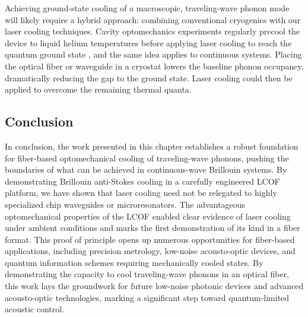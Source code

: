 Achieving ground-state cooling of a macroscopic, traveling-wave phonon mode will likely require a hybrid approach: combining conventional cryogenics with our laser cooling techniques. Cavity optomechanics experiments regularly precool the device to liquid helium temperatures before applying laser cooling to reach the quantum ground state \cite{doeleman2023brillouin}, and the same idea applies to continuous systems. Placing the optical fiber or waveguide in a cryostat lowers the baseline phonon occupancy, dramatically reducing the gap to the ground state. Laser cooling could then be applied to overcome the remaining thermal quanta.

\subsection{Conclusion}
\label{Cooling:subsec:Conclusion}

In conclusion, the work presented in this chapter establishes a robust foundation for fiber-based optomechanical cooling of traveling-wave phonons, pushing the boundaries of what can be achieved in continuous-wave Brillouin systems. By demonstrating Brillouin anti-Stokes cooling in a carefully engineered \ac{LCOF} platform, we have shown that laser cooling need not be relegated to highly specialized chip waveguides or microresonators. The advantageous optomechanical properties of the \ac{LCOF} enabled clear evidence of laser cooling under ambient conditions and marks the first demonstration of its kind in a fiber format. This proof of principle opens up numerous opportunities for fiber-based applications, including precision metrology, low-noise acousto-optic devices, and quantum information schemes requiring mechanically cooled states. By demonstrating the capacity to cool traveling-wave phonons in an optical fiber, this work lays the groundwork for future low-noise photonic devices and advanced acousto-optic technologies, marking a significant step toward quantum-limited acoustic control.

\clearpage
\thispagestyle{empty}
\null
\newpage
